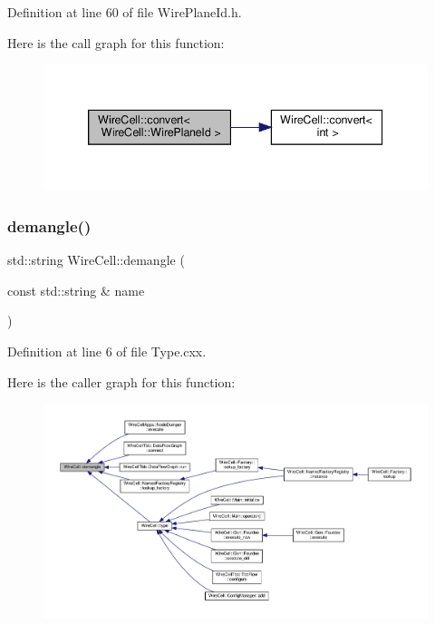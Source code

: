 Definition at line 60 of file Wire\+Plane\+Id.\+h.

Here is the call graph for this function\+:
\nopagebreak
\begin{figure}[H]
\begin{center}
\leavevmode
\includegraphics[width=339pt]{namespace_wire_cell_ac5c430ec5c4c9bbb7437f281d4094c4f_cgraph}
\end{center}
\end{figure}
\mbox{\label{namespace_wire_cell_a7d0326b3a49de0eeba671d6dc20a1959}} 
\subsubsection{\texorpdfstring{demangle()}{demangle()}}
{\footnotesize\ttfamily std\+::string Wire\+Cell\+::demangle (\begin{DoxyParamCaption}\item[{const std\+::string \&}]{name }\end{DoxyParamCaption})}



Definition at line 6 of file Type.\+cxx.

Here is the caller graph for this function\+:
\nopagebreak
\begin{figure}[H]
\begin{center}
\leavevmode
\includegraphics[width=350pt]{namespace_wire_cell_a7d0326b3a49de0eeba671d6dc20a1959_icgraph}
\end{center}
\end{figure}
\mbox{\label{namespace_wire_cell_a78bd389d29c322c5a6822bee8581ee73}} 
